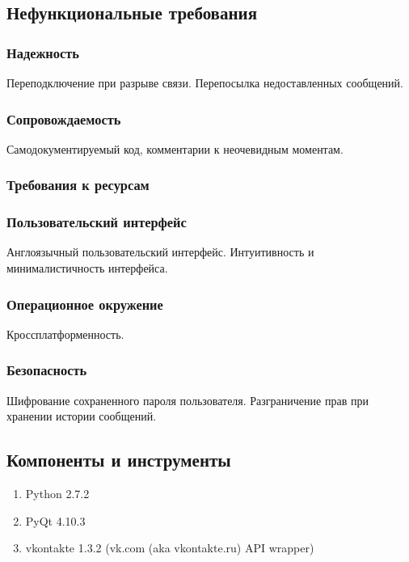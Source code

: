 \documentclass[12pt]{article}
\begin{document}
\subsection*{Нефункциональные требования}


\subsubsection*{Надежность}
Переподключение при разрыве связи. Перепосылка недоставленных сообщений.

\subsubsection*{Сопровождаемость}
Самодокументируемый код, комментарии к неочевидным моментам.

\subsubsection*{Требования к ресурсам}

\subsubsection*{Пользовательский интерфейс}
Англоязычный пользовательский интерфейс. Интуитивность и минималистичность интерфейса.

\subsubsection*{Операционное окружение}
Кроссплатформенность.

\subsubsection*{Безопасность}
Шифрование сохраненного пароля пользователя.
Разграничение прав при хранении истории сообщений.

\subsection*{Компоненты и инструменты}
% 
\begin{enumerate}
\item Python 2.7.2
\item PyQt 4.10.3
\item vkontakte 1.3.2 (vk.com (aka vkontakte.ru) API wrapper)
\end{enumerate}
\end{document}
